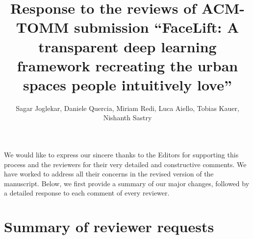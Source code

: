 \documentclass{paper}
\newenvironment{myquoteOrange}
{\definecolor{shadecolor}{rgb}{1,0.9,0.83} \begin{shaded*} \sf \em}
{\em\end{shaded*}}
\begin{document}


\title{Response to the reviews of ACM-TOMM submission ``FaceLift: A transparent deep learning framework recreating the urban spaces people intuitively love''}
\author{\small Sagar Joglekar, Daniele Quercia, Miriam Redi, Luca Aiello, Tobias Kauer, Nishanth Sastry}
\maketitle

We would like to express our sincere thanks to the Editors for supporting this process and the reviewers for their very detailed and constructive comments. We have worked to address all their concerns in the revised version of the manuscript. Below, we first provide a summary of our major changes, followed by a detailed response to each comment of every reviewer.

\section*{Summary of reviewer requests}
\end{document}
